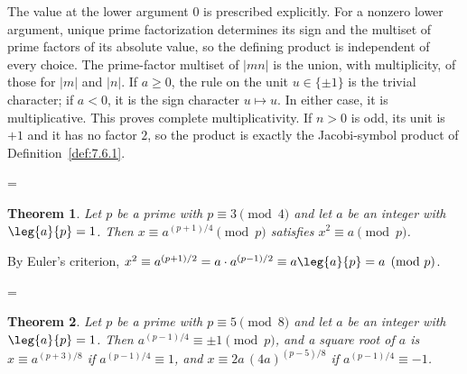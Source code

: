 \documentclass[11pt]{article}
\makeatletter
\theoremstyle{ntstyle}
\newtheorem{theorem}{Theorem}[subsection]
\let\nt@closedisplay\]
\def\nt@guardedclose{\@ifnextchar\par{\nt@closeafterpar}{\@ifnextchar\end{\postdisplaypenalty\@M\nt@closedisplay}{\nt@closedisplay}}}
\def\nt@closeafterpar\par{\@ifnextchar\par{\nt@closeafterpar}{\@ifnextchar\end{\postdisplaypenalty\@M\nt@closedisplay\par}{\nt@closedisplay\par}}}
\renewenvironment{proof}[1][\proofname]{\par
  \pushQED{\qed}\normalfont\topsep\medskipamount\edef\nt@afterproof{\@endparpenalty=\the\@endparpenalty\relax}\@beginparpenalty\@M\@endparpenalty\@M\let\]\nt@guardedclose\trivlist\item[]\textit{#1\@addpunct{.}} \ignorespaces}{\ifvmode\addpenalty\@M\fi\popQED\nt@afterproof\endtrivlist\@endpefalse}
\makeatother
\begin{document}
\begin{proof} The value at the lower argument $0$ is prescribed
	explicitly. For a nonzero lower argument, unique prime factorization
	determines its sign and the multiset of prime factors of its absolute
	value, so the defining product is independent of every choice. The
	prime-factor multiset of $|mn|$ is the union, with multiplicity, of
	those for $|m|$ and $|n|$. If $a\ge0$, the rule on the unit
	$u\in\{\pm1\}$ is the trivial character; if $a<0$, it is the sign
	character $u\mapsto u$. In either case, it is multiplicative. This proves complete
	multiplicativity. If $n>0$ is odd, its unit is $+1$ and it has no factor
	$2$, so the product is exactly the Jacobi-symbol product of Definition~\ref{def:7.6.1}.

\end{proof}
\begin{theorem}\label{thm:7.6.5} Let $p$ be a prime with $p \equiv 3
		\pmod{4}$ and let $a$ be an integer with $\leg{a}{p} = 1$. Then $x
		\equiv a^{(p+1)/4} \pmod{p}$ satisfies $x^{2} \equiv a \pmod{p}$.

\end{theorem}

\begin{proof} By Euler's criterion, $x^2 \equiv a^{(p+1)/2} = a \cdot a^{(p-1)/2}
		\equiv a\leg{a}{p} = a \pmod{p}$.

\end{proof}
\begin{theorem}\label{thm:7.6.6} Let $p$ be a prime with $p \equiv 5
		\pmod{8}$ and let $a$ be an integer with $\leg{a}{p} = 1$. Then
	$a^{(p-1)/4} \equiv \pm 1 \pmod{p}$, and a square root of $a$ is $x \equiv
		a^{(p+3)/8}$ if $a^{(p-1)/4} \equiv 1$, and $x \equiv
		2a\,(4a)^{(p-5)/8}$ if $a^{(p-1)/4} \equiv -1$.

\end{theorem}
\end{document}
